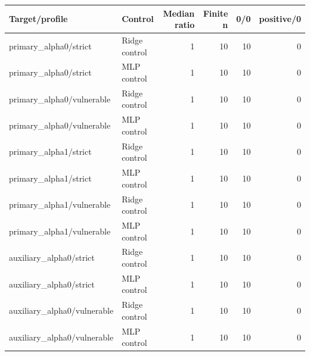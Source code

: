 \begin{tabular}{llrrrr}
\toprule
Target/profile & Control & Median ratio & Finite n & 0/0 & positive/0 \\
\midrule
primary\_alpha0/strict & Ridge control & 1 & 10 & 10 & 0 \\
primary\_alpha0/strict & MLP control & 1 & 10 & 10 & 0 \\
primary\_alpha0/vulnerable & Ridge control & 1 & 10 & 10 & 0 \\
primary\_alpha0/vulnerable & MLP control & 1 & 10 & 10 & 0 \\
primary\_alpha1/strict & Ridge control & 1 & 10 & 10 & 0 \\
primary\_alpha1/strict & MLP control & 1 & 10 & 10 & 0 \\
primary\_alpha1/vulnerable & Ridge control & 1 & 10 & 10 & 0 \\
primary\_alpha1/vulnerable & MLP control & 1 & 10 & 10 & 0 \\
auxiliary\_alpha0/strict & Ridge control & 1 & 10 & 10 & 0 \\
auxiliary\_alpha0/strict & MLP control & 1 & 10 & 10 & 0 \\
auxiliary\_alpha0/vulnerable & Ridge control & 1 & 10 & 10 & 0 \\
auxiliary\_alpha0/vulnerable & MLP control & 1 & 10 & 10 & 0 \\
\bottomrule
\end{tabular}
